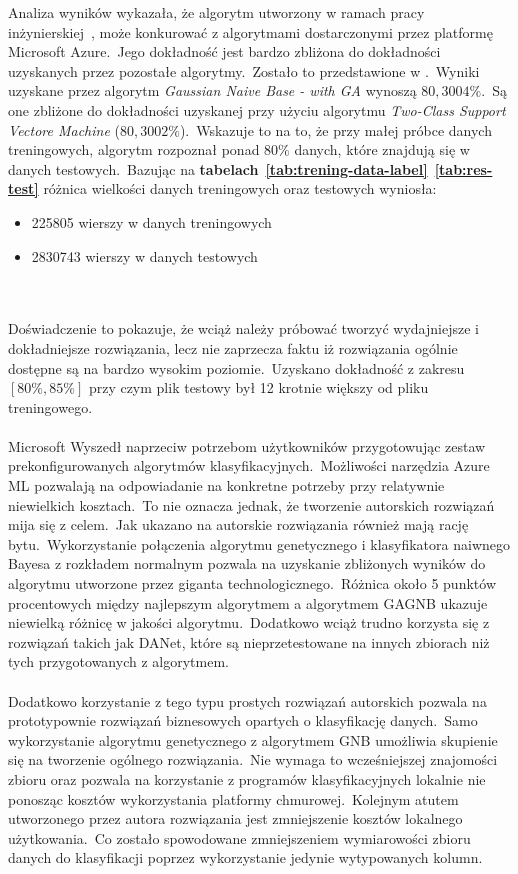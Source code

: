 Analiza wyników wykazała, że algorytm utworzony w ramach pracy inżynierskiej~\cite{Blyszcz2022}, może konkurować z algorytmami dostarczonymi przez platformę Microsoft Azure.\ Jego dokładność jest bardzo zbliżona do dokładności uzyskanych przez pozostałe algorytmy.\ Zostało to przedstawione w .\ Wyniki uzyskane przez algorytm \textit{Gaussian Naive Base - with GA} wynoszą $80,3004\%$.\ Są one zbliżone do dokładności uzyskanej przy użyciu algorytmu \textit{Two-Class Support Vectore Machine} ($80,3002\%$).\ Wskazuje to na to, że przy małej próbce danych treningowych, algorytm rozpoznał ponad $80\%$ danych, które znajdują się w danych testowych.\ Bazując na \textbf{tabelach}~\textbf{\ref{tab:trening-data-label}}~\textbf{\ref{tab:res-test}} różnica wielkości danych treningowych oraz testowych wyniosła:
\begin{itemize}
    \item 225805 wierszy w danych treningowych
    \item 2830743 wierszy w danych testowych
\end{itemize}
\\ \\
Doświadczenie to pokazuje, że wciąż należy próbować tworzyć wydajniejsze i dokładniejsze rozwiązania, lecz nie zaprzecza faktu iż rozwiązania ogólnie dostępne są na bardzo wysokim poziomie.\ Uzyskano dokładność z zakresu $[80\%, 85\%]$ przy czym plik testowy był 12 krotnie większy od pliku treningowego.
\\ \\
Microsoft Wyszedł naprzeciw potrzebom użytkowników przygotowując zestaw prekonfigurowanych algorytmów klasyfikacyjnych.\ Możliwości narzędzia Azure ML pozwalają na odpowiadanie na konkretne potrzeby przy relatywnie niewielkich kosztach.\ To nie oznacza jednak, że tworzenie autorskich rozwiązań mija się z celem.\ Jak ukazano na  autorskie rozwiązania również mają rację bytu.\ Wykorzystanie połączenia algorytmu genetycznego i klasyfikatora naiwnego Bayesa z rozkładem normalnym pozwala na uzyskanie zbliżonych wyników do algorytmu utworzone przez giganta technologicznego.\ Różnica około 5 punktów procentowych między najlepszym algorytmem a algorytmem GAGNB ukazuje niewielką różnicę w jakości algorytmu.\ Dodatkowo wciąż trudno korzysta się z rozwiązań takich jak DANet, które są nieprzetestowane na innych zbiorach niż tych przygotowanych z algorytmem.
\\ \\
Dodatkowo korzystanie z tego typu prostych rozwiązań autorskich pozwala na prototypownie rozwiązań biznesowych opartych o klasyfikację danych.\ Samo wykorzystanie algorytmu genetycznego z algorytmem GNB umożliwia skupienie się na tworzenie ogólnego rozwiązania.\ Nie wymaga to wcześniejszej znajomości zbioru oraz pozwala na korzystanie z programów klasyfikacyjnych lokalnie nie ponosząc kosztów wykorzystania platformy chmurowej.\ Kolejnym atutem utworzonego przez autora rozwiązania jest zmniejszenie kosztów lokalnego użytkowania.\ Co zostało spowodowane zmniejszeniem wymiarowości zbioru danych do klasyfikacji poprzez wykorzystanie jedynie wytypowanych kolumn.